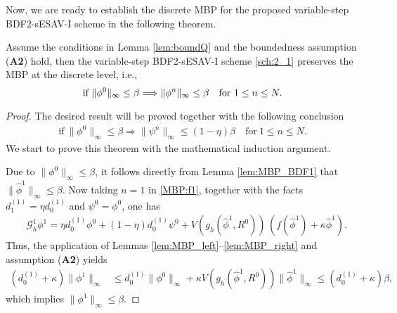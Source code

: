 \documentclass{m2an}
\newcommand{\mg}{\mathcal{G}}
\begin{document}
Now, we are ready to establish the discrete MBP for the proposed variable-step BDF2-sESAV-I scheme in the following theorem.

\begin{thrm}\label{thm:MBP_2} 
	Assume the conditions in Lemma \ref{lem:boundQ} and the boundedness assumption (\textbf{A2}) hold, then the variable-step BDF2-sESAV-I scheme \eqref{sch:2_1} preserves the MBP at the discrete level, i.e.,  
	$$
	\text{if}~  \| \phi^0 \|_{\infty} \leq \beta \Longrightarrow 	\| \phi^n \|_{\infty} \leq \beta \quad {\rm for} \  1 \leq n \leq N.
	$$
\end{thrm}
\begin{proof}
	The desired result will be proved together with the following conclusion
	\begin{equation}\label{MBP:f3}
		\begin{aligned}
			\text{if}~  \| \phi^0 \|_{\infty} \leq \beta \Longrightarrow  \| \psi^{n} \|_{ \infty } \leq ( 1 - \eta ) \beta \quad \text{for} \  1 \leq n \leq N.
		\end{aligned}
	\end{equation}
	We start to prove this theorem with the mathematical induction argument. 
	
	Due to $ \| \phi^0 \|_{\infty} \leq \beta $, it follows directly from Lemma \ref{lem:MBP_BDF1} that $ \| \hat{ \phi }^{1} \|_{\infty} \leq \beta $. Now taking $ n = 1 $ in \eqref{MBP:f1}, together with the facts $ d^{(1)}_{1} = \eta d^{(1)}_{0} $ and $ \psi^0 = \phi^0 $, one has
	\begin{equation*}
		\begin{aligned}
			& \mg_h^{1} \phi^{1} = \eta d^{(1)}_{0} \phi^{0} + ( 1 - \eta) d^{(1)}_{0} \psi^{0} +  V( g_h(\hat{\phi}^{1}, R^{0}) )\, ( f(\hat{\phi}^{1}) + \kappa \hat{\phi}^{1} ) .
		\end{aligned}
	\end{equation*}
	Thus, the application of Lemmas \ref{lem:MBP_left}--\ref{lem:MBP_right} and assumption (\textbf{A2}) yields
	$$
	\begin{aligned}
		( d^{(1)}_{0} + \kappa ) \| \phi^{1} \|_{ \infty } & \leq d^{(1)}_{0} \| \phi^{0} \|_{ \infty } + \kappa V( g_h(\hat{\phi}^{1}, R^{0}) ) \| \hat{\phi}^{1} \|_{ \infty } \leq ( d^{(1)}_{0} + \kappa ) \beta,
	\end{aligned}
	$$
	which implies $ \| \phi^{1} \|_{ \infty } \leq \beta $. 
	

\end{proof}
\end{document}

